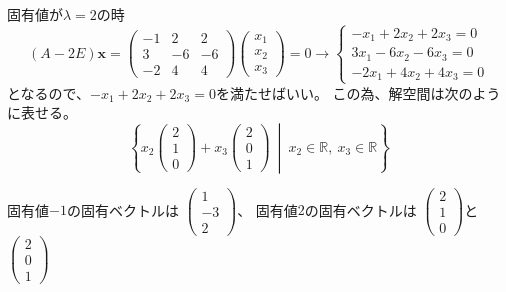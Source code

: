 \documentclass[10pt,b5paper]{ltjsarticle}
\begin{document}
\begin{enumerate}
\begin{enumerate}
              固有値が$\lambda =2$の時
              \begin{equation}
               (A-2E)\bm{x}=
                \begin{pmatrix} -1&2&2\\ 3&-6&-6\\ -2&4&4\end{pmatrix}
                \begin{pmatrix} x_1\\ x_2\\ x_3\end{pmatrix}
                =0
                 \longrightarrow
                 \begin{cases}
                  -x_1 + 2x_2 + 2x_3 =0\\
                  3x_1 - 6x_2 - 6x_3 =0\\
                  -2x_1 + 4x_2 + 4x_3 =0
                 \end{cases}
              \end{equation}
              となるので、$-x_1 + 2x_2 + 2x_3 =0$を満たせばいい。
              この為、解空間は次のように表せる。
              \begin{equation}
               \left\{
                x_2\begin{pmatrix} 2\\ 1\\ 0\end{pmatrix}
                +x_3\begin{pmatrix} 2\\ 0\\ 1\end{pmatrix}
                \ \middle|\
                x_2 \in \mathbb{R}, \
                x_3 \in \mathbb{R}
               \right\}
              \end{equation}

              固有値$-1$の固有ベクトルは
              $\begin{pmatrix} 1\\ -3\\ 2\end{pmatrix}$、
              固有値$2$の固有ベクトルは
              $\begin{pmatrix} 2\\ 1\\ 0\end{pmatrix}$と
              $\begin{pmatrix} 2\\ 0\\ 1\end{pmatrix}$


\end{enumerate}
\end{enumerate}
\end{document}
